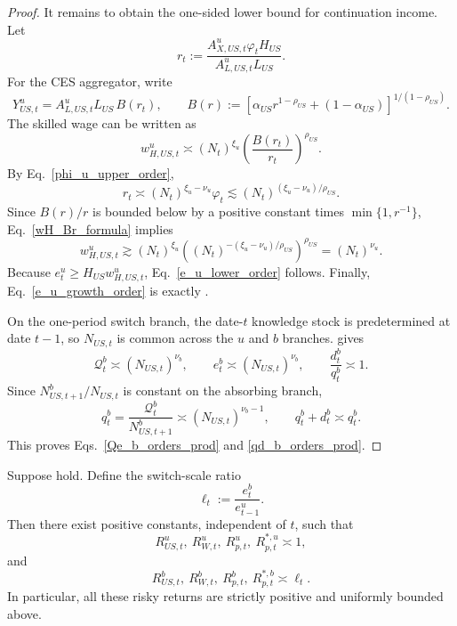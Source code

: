 \documentclass{article}
\begin{document}
\begin{proof}
It remains to obtain the one-sided lower bound for continuation income. Let
\[
r_t:=\frac{A_{X,US,t}^u\varphi_tH_{US}}{A_{L,US,t}^uL_{US}}.
\]
For the CES aggregator, write
\[
Y_{US,t}^u=A_{L,US,t}^uL_{US}\,B(r_t),
\qquad
B(r):=\left[\alpha_{US}r^{1-\rho_{US}}+(1-\alpha_{US})\right]^{1/(1-\rho_{US})}.
\]
The skilled wage can be written as
\begin{equation}\label{wH_Br_formula}
w_{H,US,t}^u
\asymp
(N_t)^{\xi_u}\left(\frac{B(r_t)}{r_t}\right)^{\rho_{US}}.
\end{equation}
By Eq.~\eqref{phi_u_upper_order},
\[
r_t\asymp (N_t)^{\xi_u-\nu_u}\varphi_t
\lesssim
(N_t)^{(\xi_u-\nu_u)/\rho_{US}}.
\]
Since $B(r)/r$ is bounded below by a positive constant times $\min\{1,r^{-1}\}$, Eq.~\eqref{wH_Br_formula} implies
\[
w_{H,US,t}^u
\gtrsim
(N_t)^{\xi_u}\left((N_t)^{-(\xi_u-\nu_u)/\rho_{US}}\right)^{\rho_{US}}
=
(N_t)^{\nu_u}.
\]
Because $e_t^u\ge H_{US}w_{H,US,t}^u$, Eq.~\eqref{e_u_lower_order} follows. Finally, Eq.~\eqref{e_u_growth_order} is exactly .

On the one-period switch branch, the date-$t$ knowledge stock is predetermined at date $t-1$, so $N_{US,t}$ is common across the $u$ and $b$ branches.  gives
\[
\mathcal Q_t^b\asymp (N_{US,t})^{\nu_b},
\qquad
e_t^b\asymp (N_{US,t})^{\nu_b},
\qquad
\frac{d_t^b}{q_t^b}\asymp1.
\]
Since $N_{US,t+1}^b/N_{US,t}$ is constant on the absorbing branch,
\[
q_t^b=\frac{\mathcal Q_t^b}{N_{US,t+1}^b}\asymp (N_{US,t})^{\nu_b-1},
\qquad
q_t^b+d_t^b\asymp q_t^b.
\]
This proves Eqs.~\eqref{Qe_b_orders_prod} and \eqref{qd_b_orders_prod}.
\end{proof}

\begin{lem}\label{lem_risky_return_bounds}
Suppose  hold. Define the switch-scale ratio
\[
\ell_t:=\frac{e_t^b}{e_{t-1}^u}.
\]
Then there exist positive constants, independent of $t$, such that
\[
R_{US,t}^u,\ R_{W,t}^u,\ R_{p,t}^u,\ R_{p,t}^{*,u}\asymp 1,
\]
and
\[
R_{US,t}^b,\ R_{W,t}^b,\ R_{p,t}^b,\ R_{p,t}^{*,b}\asymp \ell_t.
\]
In particular, all these risky returns are strictly positive and uniformly bounded above.
\end{lem}
\end{document}
